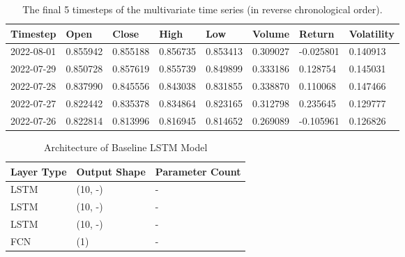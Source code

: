 \documentclass[a4paper, 11pt]{report}
\begin{document}
    \begin{table}[ht]
        \centering
        \label{table: time-series}
        \begin{tabular}{|l|lllllll|} 
            \hline
            \textbf{Timestep} & \textbf{Open} & \textbf{Close} & \textbf{High} & \textbf{Low} & \textbf{Volume} & \textbf{Return} & \textbf{Volatility}  \\ 
            \hline
            2022-08-01 & 0.855942 & 0.855188 & 0.856735 & 0.853413 & 0.309027 & -0.025801 & 0.140913    \\ 
            \hline
            2022-07-29 & 0.850728 & 0.857619 & 0.855739 & 0.849899 & 0.333186 & 0.128754  & 0.145031    \\ 
            \hline
            2022-07-28 & 0.837990 & 0.845556 & 0.843038 & 0.831855 & 0.338870 & 0.110068  & 0.147466    \\ 
            \hline
            2022-07-27 & 0.822442 & 0.835378 & 0.834864 & 0.823165 & 0.312798 & 0.235645  & 0.129777    \\ 
            \hline
            2022-07-26 & 0.822814 & 0.813996 & 0.816945 & 0.814652 & 0.269089 & -0.105961 & 0.126826    \\
            \hline
        \end{tabular}

        \caption{\centering The final 5 timesteps of the multivariate time series (in reverse chronological order).}
    \end{table}




    \begin{table}[ht]
        \centering
        \label{table: hyperparams}
        \begin{tabular}{|lll|} 
            \hline
            \textbf{Layer Type} & \textbf{Output Shape} & \textbf{Parameter Count}  \\ 
            \hline
            LSTM           & (10, -)             & -                \\ 
            \hline
            LSTM           & (10, -)             & -               \\ 
            \hline
            LSTM           & (10, -)             & -               \\ 
            \hline
            FCN            & (1)                   & -                  \\
            \hline
        \end{tabular}

        \caption{\centering Architecture of Baseline LSTM Model}
    \end{table}
\end{document}
